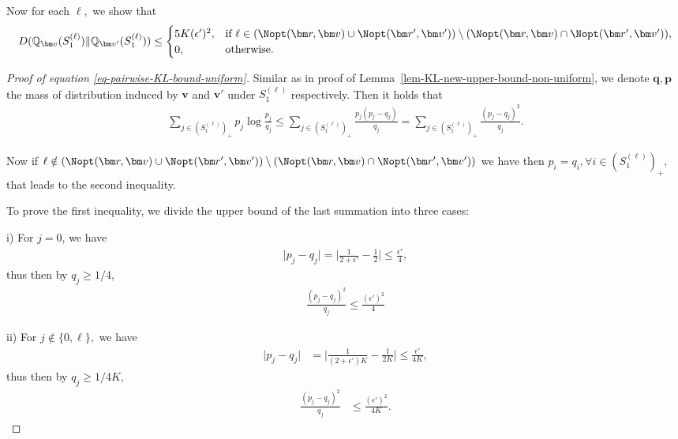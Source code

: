 \documentclass[10pt, letterpaper]{article}
\begin{document}
Now for each $\ell,$ we show that 
\begin{equation}\label{eq-pairwise-KL-bound-uniform}
D(\mathbb{Q}_{\bm v} (S^{(\ell)}_1) \rVert \mathbb{Q}_{\bm v'} (S^{(\ell)}_1))\leq\begin{cases}
    5K(\epsilon')^2,  & \text{if }  \ell \in (\Nopt(\bm r, \bm v) \cup \Nopt(\bm r', \bm v'))\setminus(\Nopt(\bm r, \bm v)\cap \Nopt(\bm r', \bm v')), \\
    0,& \text{otherwise.}
\end{cases} 
\end{equation}

\begin{proof}[Proof of equation \eqref{eq-pairwise-KL-bound-uniform}]
   Similar as in proof of Lemma~\ref{lem-KL-new-upper-bound-non-uniform}, we denote $\bm q, \bm p$ the mass of distribution induced by $\bm {v}$ and $\bm {v'}$ under $S^{(\ell)}_1$ respectively. 
Then it holds that \begin{align*}
    \sum_{j\in (S^{(\ell)}_1)_+} p_j \log \frac{p_j}{q_j} \leq \sum_{j\in (S^{(\ell)}_1)_+}\frac{p_j(p_j - q_j)}{q_j}= \sum_{j\in (S^{(\ell)}_1)_+}\frac{(p_j - q_j)^2}{q_j}. 
\end{align*} 

Now if $\ell \notin (\Nopt(\bm r, \bm v) \cup \Nopt(\bm r', \bm v'))\setminus(\Nopt(\bm r, \bm v)\cap \Nopt(\bm r', \bm v'))$ we have then $p_i =q_i, \forall i \in (S^{(\ell)}_1)_+,$ that leads to the second inequality.


To prove the first inequality, we divide the upper bound of the last summation into three cases:

\noindent i) For $j = 0$, we have \begin{align*}
    \lvert p_j - q_j \rvert = \lvert \frac{1}{2+{\epsilon'}} - \frac{1}{2}\rvert\leq \frac{{\epsilon'}}{4},
\end{align*}
thus then by $q_j \geq 1/4$, \begin{align*}
    \frac{(p_j -q_j)^2}{q_j}\leq \frac{(\epsilon')^2}{4}
\end{align*}

\noindent ii) For $j \notin \{0,\ell\},$ we have \begin{align*}
    \lvert p_j - q_j\rvert &=  \Big| \frac{1}{(2+{\epsilon'})K} - \frac{1}{2K} \Big|\leq  \frac{{\epsilon'}}{4K},
\end{align*}
thus then by $q_j \geq 1/4K,$
\begin{align*}
    \frac{(p_j - q_j)^2}{q_j} & \leq \frac{(\epsilon')^2}{4K} .
\end{align*}


\end{proof}
\end{document}
